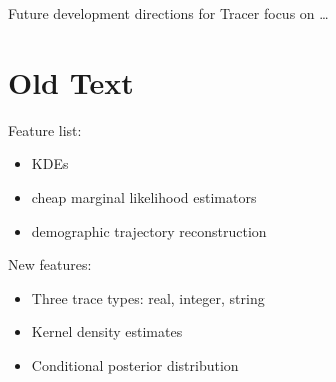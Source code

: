 \documentclass{bioinfo}
\begin{document}
Future development directions for Tracer focus on \ldots



\section*{Old Text}



Feature list:
\begin{itemize}
\item KDEs
\item cheap marginal likelihood estimators
\item demographic trajectory reconstruction
\end{itemize}

New features:
\begin{itemize}
\item Three trace types: real, integer, string
\item Kernel density estimates
\item Conditional posterior distribution
\end{itemize}


\end{document}

